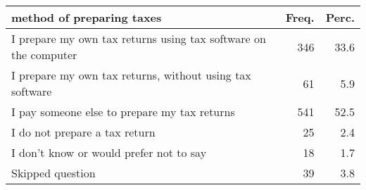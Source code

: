 \begin{table}[ht]
\centering
\begin{tabular}{lrr}
  \hline
method of preparing taxes & Freq. & Perc. \\ 
  \hline
I prepare my own tax returns using tax software on the computer & 346 & 33.6 \\ 
  I prepare my own tax returns, without using tax software & 61 & 5.9 \\ 
  I pay someone else to prepare my tax returns & 541 & 52.5 \\ 
  I do not prepare a tax return & 25 & 2.4 \\ 
  I don't know or would prefer not to say & 18 & 1.7 \\ 
  Skipped question & 39 & 3.8 \\ 
   \hline
\end{tabular}
\end{table}
